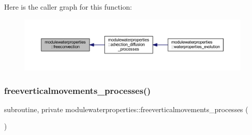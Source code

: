 Here is the caller graph for this function\+:\nopagebreak
\begin{figure}[H]
\begin{center}
\leavevmode
\includegraphics[width=350pt]{namespacemodulewaterproperties_a2ac3ef009338f33bfef1ccc910ccf6d7_icgraph}
\end{center}
\end{figure}
\mbox{\label{namespacemodulewaterproperties_a877a92e454e3c5723e48cbb8f6c322d8}} 
\subsubsection{\texorpdfstring{freeverticalmovements\+\_\+processes()}{freeverticalmovements\_processes()}}
{\footnotesize\ttfamily subroutine, private modulewaterproperties\+::freeverticalmovements\+\_\+processes (\begin{DoxyParamCaption}{ }\end{DoxyParamCaption})\hspace{0.3cm}{\ttfamily [private]}}

